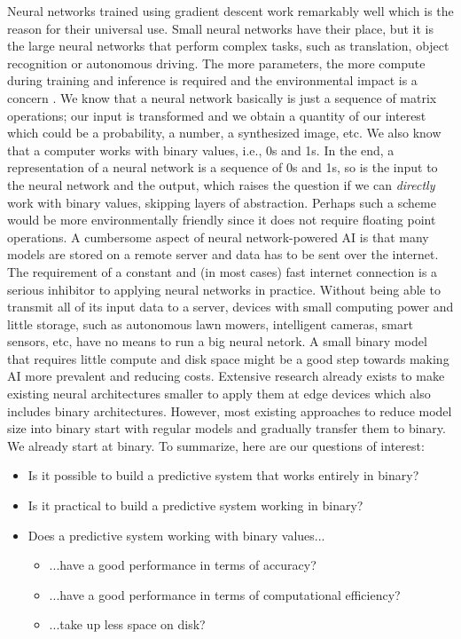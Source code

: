 Neural networks trained using gradient descent work remarkably well which is the reason for their universal use. Small neural networks have their place, but it is the large neural networks that perform complex tasks, such as translation, object recognition or autonomous driving. The more parameters, the more compute during training and inference is required and the environmental impact is a concern \cite{bib:schwartz2020green}. We know that a neural network basically is just a sequence of matrix operations; our input is transformed and we obtain a quantity of our interest which could be a probability, a number, a synthesized image, etc. We also know that a computer works with binary values, i.e., 0s and 1s. In the end, a representation of a neural network is a sequence of 0s and 1s, so is the input to the neural network and the output, which raises the question if we can \textit{directly} work with binary values, skipping layers of abstraction. Perhaps such a scheme would be more environmentally friendly since it does not require floating point operations. A cumbersome aspect of neural network-powered AI is that many models are stored on a remote server and data has to be sent over the internet. The requirement of a constant and (in most cases) fast internet connection is a serious inhibitor to applying neural networks in practice. Without being able to transmit all of its input data to a server, devices with small computing power and little storage, such as autonomous lawn mowers, intelligent cameras, smart sensors, etc, have no means to run a big neural netork. A small binary model that requires little compute and disk space might be a good step towards making AI more prevalent and reducing costs. Extensive research already exists to make existing neural architectures smaller to apply them at edge devices \cite{bib:liu2021bringing} which also includes binary architectures. However, most existing approaches to reduce model size into binary start with regular models and gradually transfer them to binary. We already start at binary. To summarize, here are our questions of interest:

\begin{itemize}
  \item Is it possible to build a predictive system that works entirely in binary?
  \item Is it practical to build a predictive system working in binary?
  \item Does a predictive system working with binary values...
    \begin{itemize}
      \item ...have a good performance in terms of accuracy?
      \item ...have a good performance in terms of computational efficiency?
      \item ...take up less space on disk?
    \end{itemize}
\end{itemize}
